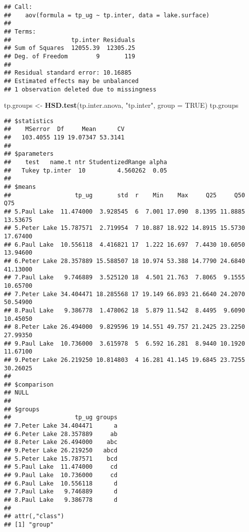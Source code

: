 \documentclass[]{article}
\newenvironment{Shaded}{\begin{snugshade}}{\end{snugshade}}
\newcommand{\DataTypeTok}[1]{\textcolor[rgb]{0.13,0.29,0.53}{#1}}
\newcommand{\KeywordTok}[1]{\textcolor[rgb]{0.13,0.29,0.53}{\textbf{#1}}}
\newcommand{\NormalTok}[1]{#1}
\newcommand{\OtherTok}[1]{\textcolor[rgb]{0.56,0.35,0.01}{#1}}
\newcommand{\StringTok}[1]{\textcolor[rgb]{0.31,0.60,0.02}{#1}}
\begin{document}
\begin{verbatim}
## Call:
##    aov(formula = tp_ug ~ tp.inter, data = lake.surface)
## 
## Terms:
##                 tp.inter Residuals
## Sum of Squares  12055.39  12305.25
## Deg. of Freedom        9       119
## 
## Residual standard error: 10.16885
## Estimated effects may be unbalanced
## 1 observation deleted due to missingness
\end{verbatim}

\begin{Shaded}
\begin{Highlighting}[]
\NormalTok{tp.groups <-}\StringTok{ }\KeywordTok{HSD.test}\NormalTok{(tp.inter.anova, }\StringTok{"tp.inter"}\NormalTok{, }\DataTypeTok{group =} \OtherTok{TRUE}\NormalTok{)}
\NormalTok{tp.groups}
\end{Highlighting}
\end{Shaded}

\begin{verbatim}
## $statistics
##    MSerror  Df     Mean      CV
##   103.4055 119 19.07347 53.3141
## 
## $parameters
##    test   name.t ntr StudentizedRange alpha
##   Tukey tp.inter  10         4.560262  0.05
## 
## $means
##                  tp_ug       std  r    Min    Max     Q25     Q50      Q75
## 5.Paul Lake  11.474000  3.928545  6  7.001 17.090  8.1395 11.8885 13.53675
## 5.Peter Lake 15.787571  2.719954  7 10.887 18.922 14.8915 15.5730 17.67400
## 6.Paul Lake  10.556118  4.416821 17  1.222 16.697  7.4430 10.6050 13.94600
## 6.Peter Lake 28.357889 15.588507 18 10.974 53.388 14.7790 24.6840 41.13000
## 7.Paul Lake   9.746889  3.525120 18  4.501 21.763  7.8065  9.1555 10.65700
## 7.Peter Lake 34.404471 18.285568 17 19.149 66.893 21.6640 24.2070 50.54900
## 8.Paul Lake   9.386778  1.478062 18  5.879 11.542  8.4495  9.6090 10.45050
## 8.Peter Lake 26.494000  9.829596 19 14.551 49.757 21.2425 23.2250 27.99350
## 9.Paul Lake  10.736000  3.615978  5  6.592 16.281  8.9440 10.1920 11.67100
## 9.Peter Lake 26.219250 10.814803  4 16.281 41.145 19.6845 23.7255 30.26025
## 
## $comparison
## NULL
## 
## $groups
##                  tp_ug groups
## 7.Peter Lake 34.404471      a
## 6.Peter Lake 28.357889     ab
## 8.Peter Lake 26.494000    abc
## 9.Peter Lake 26.219250   abcd
## 5.Peter Lake 15.787571    bcd
## 5.Paul Lake  11.474000     cd
## 9.Paul Lake  10.736000     cd
## 6.Paul Lake  10.556118      d
## 7.Paul Lake   9.746889      d
## 8.Paul Lake   9.386778      d
## 
## attr(,"class")
## [1] "group"
\end{verbatim}
\end{document}
